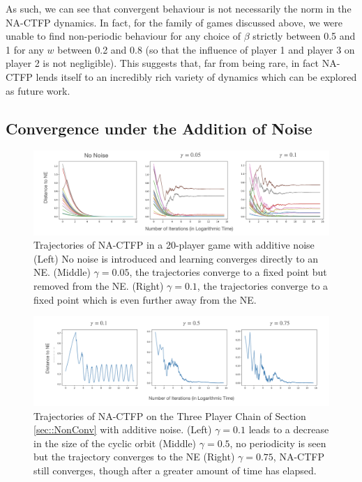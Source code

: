 \documentclass{article}
\theoremstyle{definition}
\begin{document}
  As such, we can see that convergent behaviour is not necessarily the norm in the NA-CTFP dynamics. In fact, for the family of games discussed above, we were unable to find non-periodic behaviour for any choice of $\beta$ strictly between 0.5 and 1 for any $w$ between 0.2 and 0.8 (so that the influence of player 1 and player 3 on player 2 is not negligible). This suggests that, far from being rare, in fact NA-CTFP lends itself to an incredibly rich variety of dynamics which can be explored as future work.
  

  \subsection{Convergence under the Addition of Noise}

  \begin{figure}[t]
    \centering
    \includegraphics[width = 0.9 \columnwidth]{Figures/Noise20Player.png}
    \caption{\label{fig::Noise20Player} Trajectories of NA-CTFP in a 20-player game with additive noise (Left) No noise is introduced and learning converges directly to an NE. (Middle) $\gamma = 0.05$, the trajectories converge to a fixed point but removed from the NE. (Right) $\gamma = 0.1$, the trajectories converge to a fixed point which is even further away from the NE.}
  \end{figure}

  \begin{figure}[t]
    \centering
    \includegraphics[width = 0.9 \columnwidth]{Figures/3PlayerChainNoise.png}
    \caption{\label{fig::3PlayerChainNoise} Trajectories of NA-CTFP on the Three Player Chain of Section \ref{sec::NonConv} with additive noise. (Left) $\gamma = 0.1$ leads to a decrease in the size of the cyclic orbit (Middle) $\gamma = 0.5$, no periodicity is seen but the trajectory converges to the NE (Right) $\gamma = 0.75$, NA-CTFP still converges, though after a greater amount of time has elapsed.}
  \end{figure}
\end{document}
